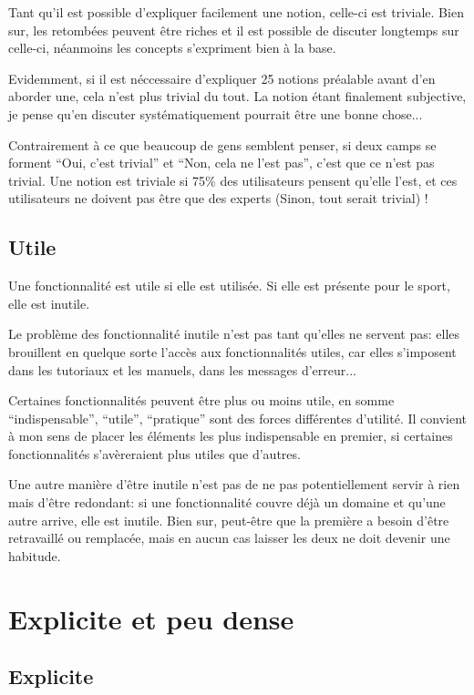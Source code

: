 \documentclass[a5paper, 12pt]{book}
\begin{document}
Tant qu'il est possible d'expliquer facilement une notion,
celle-ci est triviale. Bien sur, les retombées peuvent être
riches et il est possible de discuter longtemps sur celle-ci,
néanmoins les concepts s'expriment bien à la base.

Evidemment, si il est néccessaire d'expliquer 25 notions
préalable avant d'en aborder une, cela n'est plus trivial
du tout. La notion étant finalement subjective, je pense
qu'en discuter systématiquement pourrait être une bonne
chose...

Contrairement à ce que beaucoup de gens semblent penser,
si deux camps se forment ``Oui, c'est trivial'' et ``Non,
cela ne l'est pas'', c'est que ce n'est pas trivial.
Une notion est triviale si 75\% des utilisateurs pensent
qu'elle l'est, et ces utilisateurs ne doivent pas être
que des experts (Sinon, tout serait trivial) !

\section{Utile}

Une fonctionnalité est utile si elle est utilisée.
Si elle est présente pour le sport, elle est inutile.

Le problème des fonctionnalité inutile n'est pas tant
qu'elles ne servent pas: elles brouillent en quelque
sorte l'accès aux fonctionnalités utiles, car elles
s'imposent dans les tutoriaux et les manuels, dans
les messages d'erreur...

Certaines fonctionnalités peuvent être plus ou moins
utile, en somme ``indispensable'', ``utile'', ``pratique''
sont des forces différentes d'utilité. Il convient
à mon sens de placer les éléments les plus indispensable
en premier, si certaines fonctionnalités s'avèreraient
plus utiles que d'autres.

Une autre manière d'être inutile n'est pas de ne pas
potentiellement servir à rien mais d'être redondant:
si une fonctionnalité couvre déjà un domaine et qu'une
autre arrive, elle est inutile. Bien sur, peut-être
que la première a besoin d'être retravaillé ou remplacée,
mais en aucun cas laisser les deux ne doit devenir une
habitude.

\chapter{Explicite et peu dense}

\section{Explicite}
\end{document}
